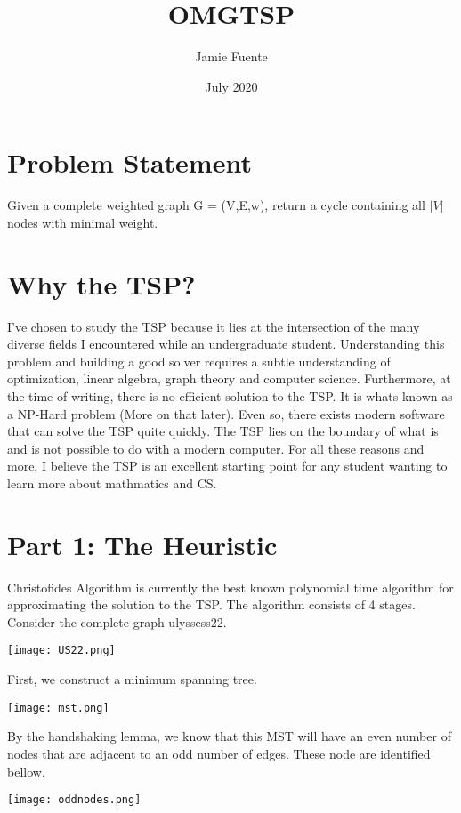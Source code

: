 \documentclass{article}
\title{OMGTSP}
\author{Jamie Fuente}
\date{July 2020}
\begin{document}
    \maketitle
    \section*{Problem Statement}
        Given a complete weighted graph G = (V,E,w), return a cycle containing all $|V|$ nodes
        with minimal weight.
    \section*{Why the TSP?}
        I've chosen to study the TSP because it lies at the intersection of the many diverse fields
        I encountered while an undergraduate student.
        Understanding this problem and building a good solver requires a subtle understanding of optimization, linear
        algebra, graph theory and computer science.
        Furthermore, at the time of writing, there is no efficient solution to the TSP. It is whats known as a NP-Hard
        problem (More on that later).
        Even so, there exists modern software that can solve the TSP quite quickly.
        The TSP lies on the boundary of what is and is not possible to do with a modern computer.
        For all these reasons and more, I believe the TSP is an excellent starting point for any student wanting to
        learn more about mathmatics and CS.
    \newpage
    \section*{Part 1: The Heuristic}
        Christofides Algorithm is currently the best known polynomial time algorithm for approximating the solution to
        the TSP. The algorithm consists of 4 stages.
        Consider the complete graph ulyssess22.
        \begin{center}
            \texttt{[image: US22.png]}
        \end{center}

        First, we construct a minimum spanning tree.
        \begin{center}
            \texttt{[image: mst.png]}
        \end{center}
        By the handshaking lemma, we know that this MST will have
        an even number of nodes that are adjacent to an odd number of
        edges.
        These node are identified bellow.
        \begin{center}
            \texttt{[image: oddnodes.png]}
        \end{center}
\end{document}
